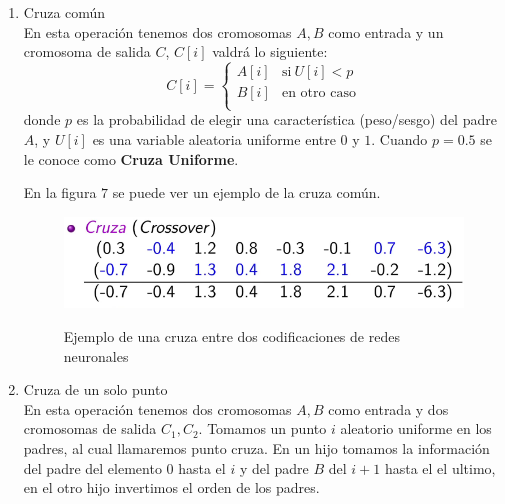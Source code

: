 \documentclass[twocolumn,spanish]{revtex4-1}
\begin{document}
\begin{enumerate}
    \item Cruza común\\
        En esta operación tenemos dos cromosomas $A, B$ como entrada y un cromosoma de salida $C$, $C[i]$ valdrá lo siguiente:\\
        \begin{equation*}
            C[i]=
            \begin{cases}
                A[i] &  \text{si}\ U[i]<p \\
                B[i] & \text{en otro caso} \\
            \end{cases}
        \end{equation*}
        donde $p$ es la probabilidad de elegir una característica (peso/sesgo) del padre $A$, y $U[i]$ es una variable aleatoria uniforme entre $0$ y $1$. Cuando $p=0.5$ se le conoce como \textbf{Cruza Uniforme}.
        
        En la figura $7$ se puede ver un ejemplo de la cruza común.
        \begin{figure}[H]
        \centering
        \includegraphics[width=0.9\linewidth]{images/cruza.png}
        \begin{quote}
        \caption{Ejemplo de una cruza entre dos codificaciones de redes neuronales
        \protect\cite{profa}}
        \end{quote}
        \label{fig:cruza}
        \end{figure}
    \item Cruza de un solo punto\\
        En esta operación tenemos dos cromosomas $A, B$ como entrada y dos cromosomas de salida $C_1, C_2$. Tomamos un punto $i$ aleatorio uniforme en los padres, al cual llamaremos punto cruza. En un hijo tomamos la información del padre del elemento $0$ hasta el $i$ y del padre $B$ del $i+1$ hasta el el ultimo, en el otro hijo invertimos el orden de los padres.
        

\end{enumerate}
\end{document}
